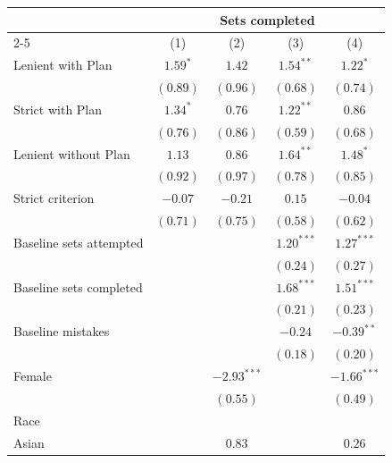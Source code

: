 \begin{tabular}{l c c c c}
\toprule
 & \multicolumn{4}{c}{Sets completed} \\
\cmidrule(lr){2-5}
 & (1) & (2) & (3) & (4) \\
\midrule
Lenient with Plan        & $1.59^{*}$    & $1.42$        & $1.54^{**}$   & $1.22^{*}$    \\
                         & $(0.89)$      & $(0.96)$      & $(0.68)$      & $(0.74)$      \\
Strict with Plan         & $1.34^{*}$    & $0.76$        & $1.22^{**}$   & $0.86$        \\
                         & $(0.76)$      & $(0.86)$      & $(0.59)$      & $(0.68)$      \\
Lenient without Plan     & $1.13$        & $0.86$        & $1.64^{**}$   & $1.48^{*}$    \\
                         & $(0.92)$      & $(0.97)$      & $(0.78)$      & $(0.85)$      \\
Strict criterion         & $-0.07$       & $-0.21$       & $0.15$        & $-0.04$       \\
                         & $(0.71)$      & $(0.75)$      & $(0.58)$      & $(0.62)$      \\
Baseline sets attempted  &               &               & $1.20^{***}$  & $1.27^{***}$  \\
                         &               &               & $(0.24)$      & $(0.27)$      \\
Baseline sets completed  &               &               & $1.68^{***}$  & $1.51^{***}$  \\
                         &               &               & $(0.21)$      & $(0.23)$      \\
Baseline mistakes        &               &               & $-0.24$       & $-0.39^{**}$  \\
                         &               &               & $(0.18)$      & $(0.20)$      \\
Female                   &               & $-2.93^{***}$ &               & $-1.66^{***}$ \\
                         &               & $(0.55)$      &               & $(0.49)$      \\
Race                     &               &               &               &               \\
\quad Asian              &               & $0.83$        &               & $0.26$        \\

\end{tabular}

